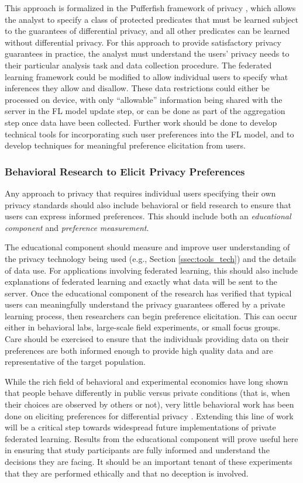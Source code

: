\documentclass[11pt]{article}
\begin{document}
This approach is formalized in the Pufferfish framework of privacy \cite{pufferfish}, which allows the analyst to specify a class of protected predicates that must be learned subject to the guarantees of differential privacy, and all other predicates can be learned without differential privacy. For this approach to provide satisfactory privacy guarantees in practice, the analyst must understand the users' privacy needs to their particular analysis task and data collection procedure. The federated learning framework could be modified to allow individual users to specify what inferences they allow and disallow. These data restrictions could either be processed on device, with only ``allowable'' information being shared with the server in the FL model update step, or can be done as part of the aggregation step once data have been collected.  Further work should be done to develop technical tools for incorporating such user preferences into the FL model, and to develop techniques for meaningful preference elicitation from users.

\subsubsection{Behavioral Research to Elicit Privacy Preferences} 
Any approach to privacy that requires individual users specifying their own privacy standards should also include behavioral or field research to ensure that users can express informed preferences.  This should include both an \emph{educational component} and \emph{preference measurement}.

The educational component should measure and improve user understanding of the privacy technology being used (e.g., Section \ref{ssec:tools_tech}) and the details of data use.  For applications involving federated learning, this should also include explanations of federated learning and exactly what data will be sent to the server.  Once the educational component of the research has verified that typical users can meaningfully understand the privacy guarantees offered by a private learning process, then researchers can begin preference elicitation.  This can occur either in behavioral labs, large-scale field experiments, or small focus groups.  Care should be exercised to ensure that the individuals providing data on their preferences are both informed enough to provide high quality data and are representative of the target population.

While the rich field of behavioral and experimental economics have long shown that people behave differently in public versus private conditions (that is, when their choices are observed by others or not), very little behavioral work has been done on eliciting preferences for differential privacy \cite{CDHL19,AS19}.  Extending this line of work will be a critical step towards widespread future implementations of private federated learning. Results from the educational component will prove useful here in ensuring that study participants are fully informed and understand the decisions they are facing. It should be an important tenant of these experiments that they are performed ethically and that no deception is involved.
\end{document}
